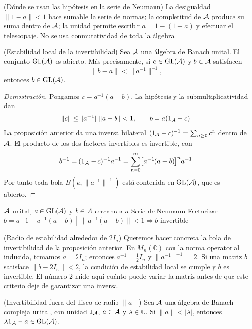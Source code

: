 \begin{cthnota}{(Dónde se usan las hipótesis en la serie de Neumann)}
La desigualdad $\|1-a\|<1$ hace sumable la serie de normas; la completitud de $\mathcal A$ produce
su suma dentro de $\mathcal A$; la unidad permite escribir $a=1-(1-a)$ y efectuar el telescopaje.
No se usa conmutatividad de toda la álgebra.
\end{cthnota}

\begin{cthproposicion}{(Estabilidad local de la invertibilidad)}
Sea $\mathcal A$ una álgebra de Banach unital. El conjunto $\operatorname{GL}(\mathcal A)$ es abierto.
Más precisamente, si $a\in\operatorname{GL}(\mathcal A)$ y $b\in\mathcal A$ satisfacen
\[
 \|b-a\|<\|a^{-1}\|^{-1},
\]
entonces $b\in\operatorname{GL}(\mathcal A)$.
\end{cthproposicion}

\begin{proof}[Demostración]
Pongamos $c=a^{-1}(a-b)$. La hipótesis y la submultiplicatividad dan
\[
 \|c\|\le \|a^{-1}\|\,\|a-b\|<1,
 \qquad b=a(1_\mathcal A-c).
\]
La proposición anterior da una inversa bilateral
$(1_\mathcal A-c)^{-1}=\sum_{n\ge0}c^n$ dentro de $\mathcal A$. El producto de
los dos factores invertibles es invertible, con
\[
 b^{-1}=(1_\mathcal A-c)^{-1}a^{-1}
 =\sum_{n=0}^{\infty}\bigl[a^{-1}(a-b)\bigr]^n a^{-1}.
\]
Por tanto toda bola $B(a,\|a^{-1}\|^{-1})$ está contenida en
$\operatorname{GL}(\mathcal A)$, que es abierto.
\end{proof}

\proofdiagram
{$\mathcal A$ unital, $a\in\operatorname{GL}(\mathcal A)$ y $b\in\mathcal A$ cercano a $a$}
{Serie de Neumann}
{Factorizar $b=a\,[1-a^{-1}(a-b)]$}
{$\|a^{-1}(a-b)\|<1\Rightarrow b$ invertible}

\begin{cthejemplo}{(Radio de estabilidad alrededor de $2I_n$)}
Queremos hacer concreta la bola de invertibilidad de la proposición anterior.
En $M_n(\mathbb C)$ con la norma operatorial inducida, tomamos
$a=2I_n$; entonces $a^{-1}=\frac12I_n$ y
$\|a^{-1}\|^{-1}=2$. Si una matriz $b$ satisface
$\|b-2I_n\|<2$, la condición de estabilidad local se cumple y
$b$ es invertible. El número $2$ mide aquí cuánto puede variar la
matriz antes de que este criterio deje de garantizar una inversa.
\end{cthejemplo}

\begin{cthcorolario}{(Invertibilidad fuera del disco de radio $\|a\|$)}
Sea $\mathcal A$ una álgebra de Banach compleja unital, con unidad $1_\mathcal A$,
$a\in\mathcal A$ y $\lambda\in\mathbb C$. Si $\|a\|<|\lambda|$, entonces
$\lambda1_\mathcal A-a\in\operatorname{GL}(\mathcal A)$.
\end{cthcorolario}

